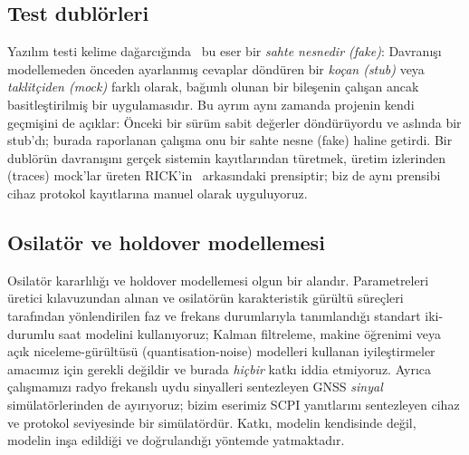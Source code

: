 \documentclass[conference]{IEEEtran}
\begin{document}
\subsection{Test dublörleri}
Yazılım testi kelime dağarcığında~\cite{meszaros2007xunit,fowler2007mocks} bu eser bir \emph{sahte nesnedir (fake)}: Davranışı modellemeden önceden ayarlanmış cevaplar döndüren bir \emph{koçan (stub)} veya \emph{taklitçiden (mock)} farklı olarak, bağımlı olunan bir bileşenin çalışan ancak basitleştirilmiş bir uygulamasıdır. Bu ayrım aynı zamanda projenin kendi geçmişini de açıklar: Önceki bir sürüm sabit değerler döndürüyordu ve aslında bir stub'dı; burada raporlanan çalışma onu bir sahte nesne (fake) haline getirdi. Bir dublörün davranışını gerçek sistemin kayıtlarından türetmek, üretim izlerinden (traces) mock'lar üreten RICK'in~\cite{tiwari2023rick} arkasındaki prensiptir; biz de aynı prensibi cihaz protokol kayıtlarına manuel olarak uyguluyoruz.

\subsection{Osilatör ve holdover modellemesi}
Osilatör kararlılığı ve holdover modellemesi olgun bir alandır. Parametreleri üretici kılavuzundan alınan ve osilatörün karakteristik gürültü süreçleri~\cite{zucca2005clock} tarafından yönlendirilen faz ve frekans durumlarıyla tanımlandığı standart iki-durumlu saat modelini kullanıyoruz; Kalman filtreleme, makine öğrenimi veya açık niceleme-gürültüsü (quantisation-noise) modelleri kullanan iyileştirmeler amacımız için gerekli değildir ve burada \emph{hiçbir} katkı iddia etmiyoruz. Ayrıca çalışmamızı radyo frekanslı uydu sinyalleri sentezleyen GNSS \emph{sinyal} simülatörlerinden de ayırıyoruz; bizim eserimiz SCPI yanıtlarını sentezleyen cihaz ve protokol seviyesinde bir simülatördür. Katkı, modelin kendisinde değil, modelin inşa edildiği ve doğrulandığı yöntemde yatmaktadır.

\end{document}
